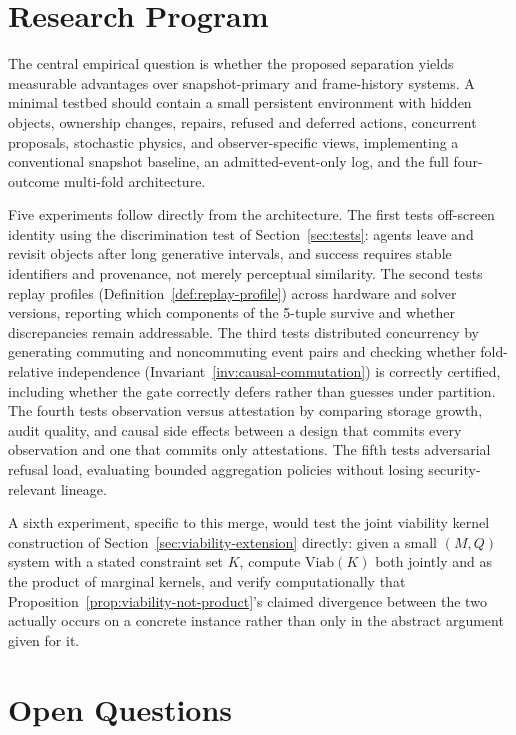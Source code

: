 \documentclass[11pt]{article}
\begin{document}
\section{Research Program}
\label{sec:research-program}

The central empirical question is whether the proposed separation yields measurable advantages over snapshot-primary and frame-history systems. A minimal testbed should contain a small persistent environment with hidden objects, ownership changes, repairs, refused and deferred actions, concurrent proposals, stochastic physics, and observer-specific views, implementing a conventional snapshot baseline, an admitted-event-only log, and the full four-outcome multi-fold architecture.

Five experiments follow directly from the architecture. The first tests off-screen identity using the discrimination test of Section~\ref{sec:tests}: agents leave and revisit objects after long generative intervals, and success requires stable identifiers and provenance, not merely perceptual similarity. The second tests replay profiles (Definition~\ref{def:replay-profile}) across hardware and solver versions, reporting which components of the 5-tuple survive and whether discrepancies remain addressable. The third tests distributed concurrency by generating commuting and noncommuting event pairs and checking whether fold-relative independence (Invariant~\ref{inv:causal-commutation}) is correctly certified, including whether the gate correctly defers rather than guesses under partition. The fourth tests observation versus attestation by comparing storage growth, audit quality, and causal side effects between a design that commits every observation and one that commits only attestations. The fifth tests adversarial refusal load, evaluating bounded aggregation policies without losing security-relevant lineage.

A sixth experiment, specific to this merge, would test the joint viability kernel construction of Section~\ref{sec:viability-extension} directly: given a small $(M,Q)$ system with a stated constraint set $K$, compute $\mathrm{Viab}(K)$ both jointly and as the product of marginal kernels, and verify computationally that Proposition~\ref{prop:viability-not-product}'s claimed divergence between the two actually occurs on a concrete instance rather than only in the abstract argument given for it.

\section{Open Questions}
\label{sec:questions}
\end{document}
